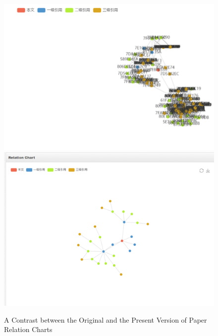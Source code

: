 \documentclass{book}
\begin{document}
\begin{figure}[H]
\centering
\includegraphics[scale=0.55]{img/zlt_rel_demo4.png}
\includegraphics[scale=0.55]{img/zlt_rel_demo5.png}
\caption{A Contrast between the Original and the Present Version of Paper Relation Charts}
\label{fig:rel_contrast}
\end{figure}
\end{document}

